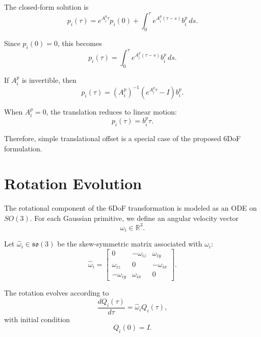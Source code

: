 \documentclass[11pt]{article}
\begin{document}
The closed-form solution is
\begin{equation}
p_i(\tau) = e^{A_i^p\tau}p_i(0) + \int_0^\tau e^{A_i^p(\tau-s)}b_i^p\,ds.
\end{equation}

Since $p_i(0)=0$, this becomes
\begin{equation}
p_i(\tau) = \int_0^\tau e^{A_i^p(\tau-s)}b_i^p\,ds.
\end{equation}

If $A_i^p$ is invertible, then
\begin{equation}
p_i(\tau) = (A_i^p)^{-1} \left( e^{A_i^p\tau}-I \right)b_i^p.
\end{equation}

When $A_i^p=0$, the translation reduces to linear motion:
\begin{equation}
p_i(\tau)=b_i^p\tau.
\end{equation}

Therefore, simple translational offset is a special case of the proposed 6DoF formulation.

\section{Rotation Evolution}

The rotational component of the 6DoF transformation is modeled as an ODE on $SO(3)$. For each Gaussian primitive, we define an angular velocity vector
\begin{equation}
\omega_i\in\mathbb{R}^3.
\end{equation}

Let $\widehat{\omega}_i\in\mathfrak{so}(3)$ be the skew-symmetric matrix associated with $\omega_i$:
\begin{equation}
\widehat{\omega}_i =
\begin{bmatrix}
0 & -\omega_{iz} & \omega_{iy}\\
\omega_{iz} & 0 & -\omega_{ix}\\
-\omega_{iy} & \omega_{ix} & 0
\end{bmatrix}.
\end{equation}

The rotation evolves according to
\begin{equation}
\frac{dQ_i(\tau)}{d\tau} = \widehat{\omega}_i Q_i(\tau),
\end{equation}
with initial condition
\begin{equation}
Q_i(0)=I.
\end{equation}
\end{document}
